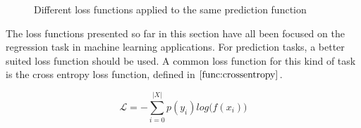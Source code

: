 \begin{figure}
    \centering
    \qquad

    \caption{Different loss functions applied to the same prediction function}%
    \label{fig:lossFunctions}%
\end{figure}

The loss functions presented so far in this section have all been focused on the regression task in machine learning applications.
For prediction tasks, a better suited loss function should be used. A common loss function for this kind of task
is the cross entropy loss function, defined in $ \eqref{func:crossentropy} $.

\[
    \mathcal{L} = - \sum_{i = 0}^{|X|}p(y_i) log\big(f(x_i)\big)
    \tag{2.5} \label{func:crossentropy}
\]








